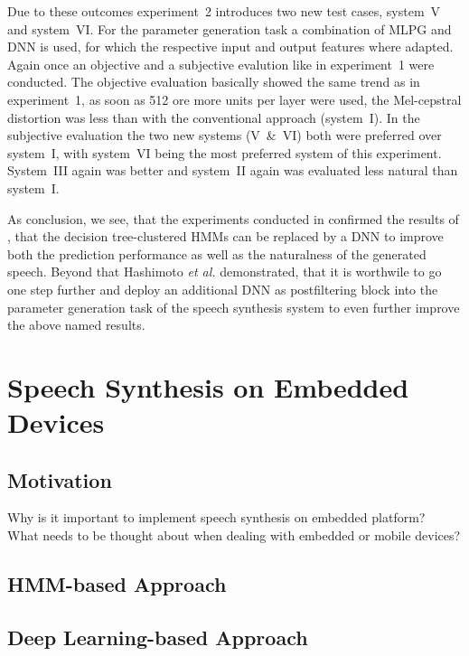 Due to these outcomes experiment~2 introduces two new test cases, system~V and system~VI. For the parameter generation task a combination of \ac{MLPG} and \ac{DNN} is used, for which the respective input and output features where adapted. Again once an objective and a subjective evalution like in experiment~1 were conducted. The objective evaluation basically showed the same trend as in experiment~1, as soon as 512 ore more units per layer were used, the Mel-cepstral distortion was less than with the conventional approach (system~I). In the subjective evaluation the two new systems (V~\&~VI) both were preferred over system~I, with system~VI being the most preferred system of this experiment. System~III again was better and system~II again was evaluated less natural than system~I.

As conclusion, we see, that the experiments conducted in \cite{hashimoto:effect} confirmed the results of \cite{zen:deepstatistical}, that the decision tree-clustered \acp{HMM} can be replaced by a \ac{DNN} to improve both the prediction performance as well as the naturalness of the generated speech. Beyond that Hashimoto \textit{et al.} demonstrated, that it is worthwile to go one step further and deploy an additional \ac{DNN} as postfiltering block into the parameter generation task of the speech synthesis system to even further improve the above named results.


\section{Speech Synthesis on Embedded Devices}
\label{sec:embeddedspeech}

\subsection{Motivation}
\label{subsec:motembedded}

Why is it important to implement speech synthesis on embedded platform?\\
What needs to be thought about when dealing with embedded or mobile devices?

\subsection{\ac{HMM}-based Approach}
\label{subsec:hmmembedded}

\subsection{Deep Learning-based Approach}
\label{subsec:deepembedded}

\clearpage
